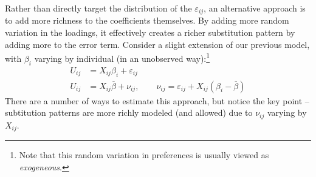 \documentclass{tufte-handout}
\theoremstyle{break}
\newtheorem{exmp}{Example}
\begin{document}


Rather than directly target the distribution of the $\varepsilon_{ij}$, an alternative approach is to add more richness to the coefficients themselves. By adding more random variation in the loadings, it effectively creates a richer substitution pattern by adding more to the error term.  Consider a slight extension of our previous model, with $\beta_{i}$ varying by individual (in an unobserved way):\footnote{Note that this random variation in preferences is usually viewed as \emph{exogeneous}.}
\begin{align*}
U_{ij} &= X_{ij}\beta_{i} + \varepsilon_{ij}\\
U_{ij} &= X_{ij}\overline{\beta} + \nu_{ij}, \qquad \nu_{ij} = \varepsilon_{ij} + X_{ij}(\beta_{i}-\overline{\beta})
\end{align*}
There are a number of ways to estimate this approach, but notice the key point -- subtitution patterns are more richly modeled (and allowed) due to $\nu_{ij}$ varying by $X_{ij}$. 
\end{document}
